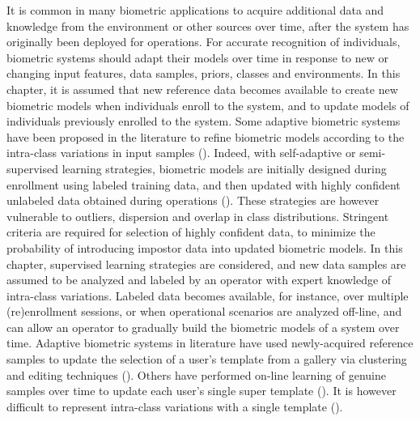 It is common in many biometric applications to acquire additional data and knowledge from the environment or other sources over time, after the system has originally been deployed for operations.
For accurate recognition of individuals, biometric systems should adapt their models over time in response to new or changing input features, data samples, priors, classes and environments.
In this chapter, it is assumed that new reference data becomes available to create new biometric models when individuals enroll to the system, and to update models of individuals previously enrolled to the system. 
Some adaptive biometric systems have been proposed in the literature to refine biometric models according to the intra-class variations in input samples (\cite{roli08}).
Indeed, with self-adaptive or semi-supervised learning strategies, biometric models are initially designed during enrollment using labeled training data, and then updated with highly confident unlabeled data obtained during operations (\cite{poh09, rattani10}).
These strategies are however vulnerable to outliers, dispersion and overlap in class distributions.
Stringent criteria are required for selection of highly confident data, to minimize the probability of introducing impostor data into updated biometric models.
In this chapter, supervised learning strategies are considered, and new data samples are assumed to be analyzed and labeled by an operator with expert knowledge of intra-class variations.
Labeled data becomes available, for instance, over multiple (re)enrollment sessions, or when operational scenarios are analyzed off-line, and can allow an operator to gradually build the biometric models of a system over time.
Adaptive biometric systems in literature have used newly-acquired reference samples to update the selection of a user's template from a gallery via clustering and editing techniques (\cite{uludag04}).
Others have performed on-line learning of genuine samples over time to update each user's single super template (\cite{jiang02}).
It is however difficult to represent intra-class variations with a single template (\cite{roli08}).

